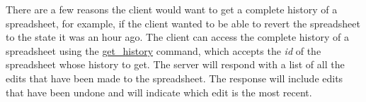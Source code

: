 There are a few reasons the client would want to get a complete history of a 
spreadsheet, for example, if the client wanted to be able to revert the 
spreadsheet to the state it was an hour ago. The client can access the 
complete history of a spreadsheet using the \hyperref[sec:message:get_history]{get\_history} 
command, which accepts the \emph{id} of the spreadsheet whose history to get. 
The server will respond with a list of all the edits that have been made to 
the spreadsheet. The response will include edits that have been undone and 
will indicate which edit is the most recent.